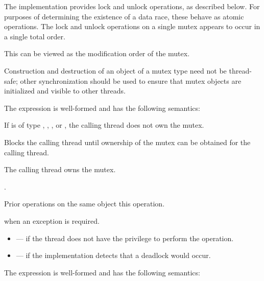 \pnum
The implementation provides lock and unlock operations, as described below.
For purposes of determining the existence of a data race, these behave as
atomic operations. The lock and unlock operations on
a single mutex appears to occur in a single total order.
\begin{note}
This
can be viewed as the modification order of the
mutex.
\end{note}
\begin{note}
Construction and
destruction of an object of a mutex type need not be thread-safe; other
synchronization should be used to ensure that mutex objects are initialized
and visible to other threads.
\end{note}

\pnum
The expression  is well-formed and has the following semantics:

\begin{itemdescr}
\pnum
\expects
If  is of type , ,
, or , the calling
thread does not own the mutex.

\pnum
{}%
\effects
Blocks the calling thread until ownership of the mutex can be obtained for the calling thread.

\pnum
\ensures
The calling thread owns the mutex.

\pnum
\returntype {}.

\pnum
\sync
Prior  operations on the same object
 this operation.

\pnum
\throws
{} when
an exception is required.

\pnum
\errors
\begin{itemize}
\item {} --- if the thread does not have the
privilege to perform the operation.

\item {} --- if the implementation detects
that a deadlock would occur.
\end{itemize}
\end{itemdescr}

\pnum
The expression  is well-formed and has the following semantics:

